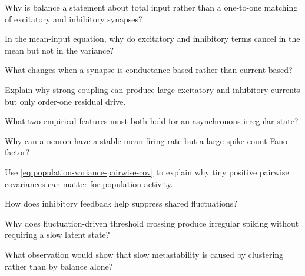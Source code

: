 \begin{conceptquestions}
  \item Why is balance a statement about total input rather than a one-to-one matching of excitatory and inhibitory synapses?
  \item In the mean-input equation, why do excitatory and inhibitory terms cancel in the mean but not in the variance?
  \item What changes when a synapse is conductance-based rather than current-based?
  \item Explain why strong coupling can produce large excitatory and inhibitory currents but only order-one residual drive.
  \item What two empirical features must both hold for an asynchronous irregular state?
  \item Why can a neuron have a stable mean firing rate but a large spike-count Fano factor?
  \item Use \cref{eq:population-variance-pairwise-cov} to explain why tiny positive pairwise covariances can matter for population activity.
  \item How does inhibitory feedback help suppress shared fluctuations?
  \item Why does fluctuation-driven threshold crossing produce irregular spiking without requiring a slow latent state?
  \item What observation would show that slow metastability is caused by clustering rather than by balance alone?
\end{conceptquestions}

\clearpage
